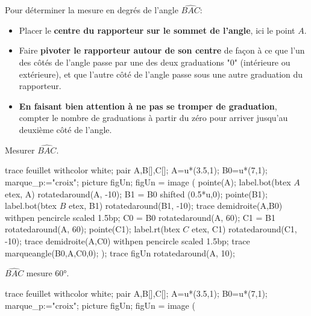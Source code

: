 \begin{changemargin}{0mm}{-20mm}
    \begin{methode*2*2}
        Pour déterminer la mesure en degrés de l'angle $\widehat{BAC}$:
        \begin{itemize}
            \item Placer le \textbf{centre du rapporteur sur le sommet de l'angle}, ici le point $A$.
            \item Faire \textbf{pivoter le rapporteur autour de son centre} de façon à ce que l'un des côtés de l'angle passe par une des deux graduations "0" (intérieure ou extérieure), et que l'autre côté de l'angle passe sous une autre graduation du rapporteur.
            \item \textbf{En faisant bien attention à ne pas se tromper de graduation}, compter le nombre de graduations à partir du zéro pour arriver jusqu'au deuxième côté de l'angle.
        \end{itemize}
        \exercice
        Mesurer $\widehat{BAC}$. \par\vspace*{5mm}
        \begin{Geometrie}[CoinHD={(8.5u,5u)}]
            trace feuillet withcolor white;
            pair A,B[],C[];
            A=u*(3.5,1);
            B0=u*(7,1);
            marque_p:="croix";
            picture figUn;
            figUn = image (
                pointe(A);
                label.bot(btex $A$ etex, A) rotatedaround(A, -10);
                B1 = B0 shifted (0.5*u,0);
                pointe(B1);
                label.bot(btex $B$ etex, B1)  rotatedaround(B1, -10);
                trace demidroite(A,B0) withpen pencircle scaled 1.5bp;
                C0 = B0 rotatedaround(A, 60);
                C1 = B1 rotatedaround(A, 60);
                pointe(C1);
                label.rt(btex $C$ etex, C1)  rotatedaround(C1, -10);            
                trace demidroite(A,C0) withpen pencircle scaled 1.5bp;
                trace marqueangle(B0,A,C0,0);
            );
            trace figUn rotatedaround(A, 10);
        \end{Geometrie}
        \correction
        $\widehat{BAC}$ mesure \ang{60}. \par\vspace*{5mm}
        \begin{Geometrie}[CoinHD={(8.5u,5u)}]
            trace feuillet withcolor white;
            pair A,B[],C[];
            A=u*(3.5,1);
            B0=u*(7,1);
            marque_p:="croix";
            picture figUn;
            figUn = image (

\end{Geometrie}
\end{methode*2*2}
\end{changemargin}
